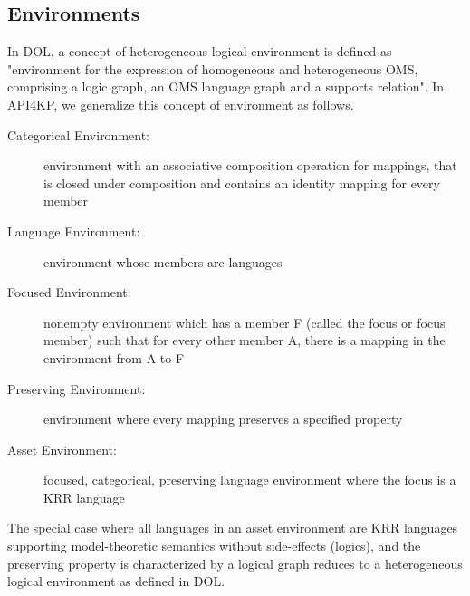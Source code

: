 \documentclass[runningheads]{llncs}
\begin{document}
\subsection{Environments}
In DOL, a concept of heterogeneous logical environment is defined as 
"environment for the
expression of homogeneous and heterogeneous OMS, comprising
a logic graph, an OMS language graph and a supports relation".
In API4KP, we generalize this concept of environment as follows.
\label{krassetenv}
\begin{description}
\item[Categorical Environment:] environment with an associative composition operation for mappings, that is closed under composition and contains an identity mapping for every member
\item[Language Environment:] environment whose members are languages
\item[Focused Environment:] nonempty environment which has a member F (called the focus or focus member) such that for every other member A, there is a mapping in the environment from A to F
\item[Preserving Environment:] environment where every mapping preserves a specified property
\item[Asset Environment:] focused, categorical, preserving language environment where the focus is a KRR language
\end{description}
The special case where all languages in an asset environment are KRR languages supporting model-theoretic semantics without side-effects (logics), and the preserving property is characterized by a logical graph reduces to a heterogeneous logical environment as defined in DOL.
\end{document}
